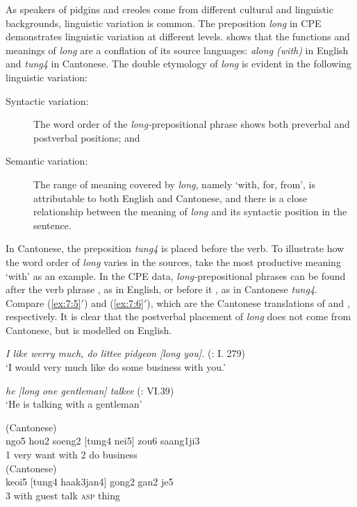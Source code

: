 \documentclass[output=paper]{langsci/langscibook}
\begin{document}
As speakers of pidgins and creoles come from different cultural and linguistic backgrounds, linguistic variation is common. The preposition \textit{long} in CPE demonstrates linguistic variation at different levels. \citet{li_origins_2011} shows that the functions and meanings of \textit{long} are a conflation of its source languages: \textit{along (with)} in English and \textit{tung4} in Cantonese. The double etymology of \textit{long} is evident in the following linguistic variation:

\begin{description}
\item [Syntactic variation:] The word order of the \textit{long-}prepositional phrase shows both preverbal and postverbal positions; and 
\item [Semantic variation:] The range of meaning covered by \textit{long}, namely ‘with, for, from’, is attributable to both English and Cantonese, and there is a close relationship between the meaning of \textit{long} and its syntactic position in the sentence.
\end{description}

In Cantonese, the preposition \textit{tung4} is placed before the verb. To illustrate how the word order of \textit{long} varies in the sources, take the most productive meaning ‘with’ as an example. In the CPE data, \textit{long-}prepositional phrases can be found after the verb phrase , as in English, or before it , as in Cantonese \textit{tung4}. Compare (\ref{ex:7:5}$'$) and (\ref{ex:7:6}$'$), which are the Cantonese translations of  and , respectively. It is clear that the postverbal placement of \textit{long} does not come from Cantonese, but is modelled on English. 

\ea%
    \label{ex:7:5}
\textit{I like werry much, do littee pidgeon [long you].} (\citealt{downing_fan-qui_1838}: I. 279)\\
\glt ‘I would very much like do some business with you.’ 

\ex%
    \label{ex:7:6}
\textit{he [long one gentleman] talkee} (\citealt{tong_chinese_1862}: VI.39)\\
\glt ‘He is talking with a gentleman’ 

 (Cantonese)\\
\gll ngo5  hou2  soeng2   [tung4   nei5]  zou6  saang1ji3\\
1    very   want    with      2    do   business\\
 (Cantonese)\\
keoi5  [tung4    haak3jan4]  gong2   gan2   je5\\
3  with        guest    talk   \textsc{asp}  thing
\z
\end{document}
